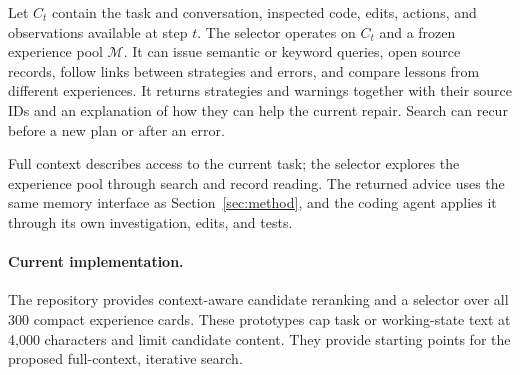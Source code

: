 Let $C_t$ contain the task and conversation, inspected code, edits, actions,
and observations available at step $t$. The selector operates on $C_t$ and
a frozen experience pool $\mathcal{M}$. It can issue semantic or keyword
queries, open source records, follow links between strategies and errors,
and compare lessons from different experiences. It returns strategies and
warnings together with their source IDs and an explanation of how they can
help the current repair. Search can recur before a new plan or after an error.

Full context describes access to the current task; the selector explores
the experience pool through search and record reading. The returned advice
uses the same memory interface as Section~\ref{sec:method}, and the coding
agent applies it through its own investigation, edits, and tests.

\paragraph{Current implementation.}
The repository provides context-aware candidate reranking and a selector
over all 300 compact experience cards. These prototypes cap task or
working-state text at 4,000 characters and limit candidate content. They
provide starting points for the proposed full-context, iterative search.
